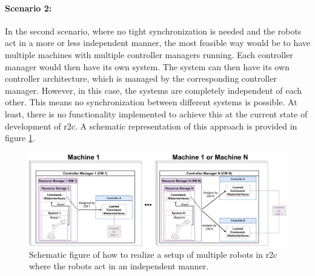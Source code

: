 \paragraph{Scenario 2:} 
In the second scenario, where no tight synchronization is needed and the robots act in a more or less independent manner, the most feasible way would be to have multiple machines with multiple controller managers running. Each controller manager would then have its own system. The system can then have its own controller architecture, which is managed by the corresponding controller manager. \newline
However, in this case, the systems are completely independent of each other. This means no synchronization between different systems is possible. At least, there is no functionality implemented to achieve this at the current state of development of \gls{r2c}. A schematic representation of this approach is provided in figure \ref{c3_fig_r2c_mr_is}.
\begin{figure}[H]
	\centering
	\includegraphics[width=1\textwidth]{Figures/c3/multiple_independent_robots_current.pdf}
	\caption{Schematic figure of how to realize a setup of multiple robots in \gls{r2c} where the robots act in an independent manner.}
	\label{c3_fig_r2c_mr_is}
\end{figure}






